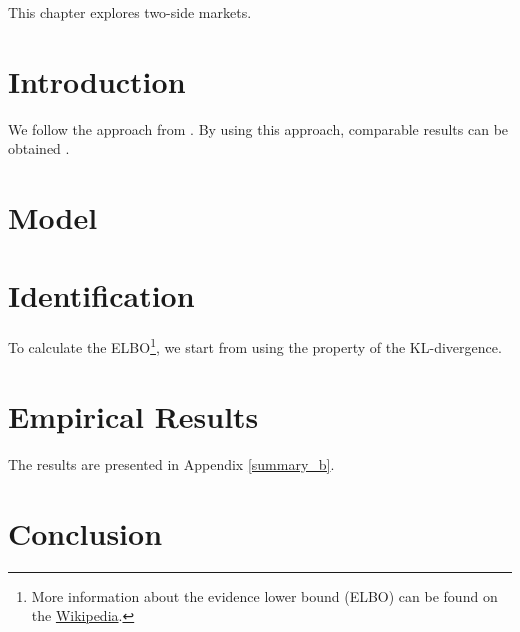 This chapter explores two-side markets. \lipsum[30]

\section{Introduction}
We follow the approach from \cite{HL2019}. \lipsum[50] By using this approach, comparable results can be obtained \citep{CES2013}.

\section{Model}
\lipsum[53]

\section{Identification}
\lipsum[16] To calculate the ELBO\footnote{More information about the evidence lower bound (ELBO) can be found on the \href{https://en.wikipedia.org/wiki/Evidence_lower_bound}{Wikipedia}. }, we start from using the property of the KL-divergence.


\section{Empirical Results}
The results are presented in Appendix \ref{summary_b}.

\section{Conclusion}
\lipsum[70]